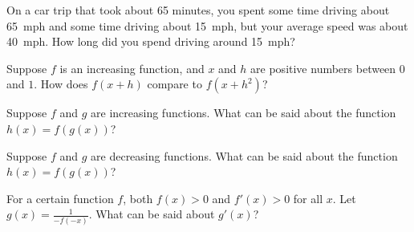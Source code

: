 \documentclass{ximera}
\newcommand{\recommendation}[1]{}
\begin{document}
\begin{problem}
  On a car trip that took about 65 minutes, you spent some time
  driving about 65~mph and some time driving about 15~mph, but your
  average speed was about 40~mph.  How long did you spend driving
  around 15~mph?
  \begin{multipleChoice}
  \end{multipleChoice}
\end{problem}

\begin{problem}
  Suppose $f$ is an increasing function, and $x$ and $h$ are positive numbers between $0$ and $1$.  How does $f(x + h)$ compare to $f(x + h^2)$?
  \begin{multipleChoice}
  \end{multipleChoice}
\end{problem}

\begin{problem}
  Suppose $f$ and $g$ are increasing functions.  What can be said about the function $h(x) = f(g(x))$?
  \begin{multipleChoice}
  \end{multipleChoice}
\end{problem}

\begin{problem}
  Suppose $f$ and $g$ are decreasing functions.  What can be said about the function $h(x) = f(g(x))$?
  \begin{multipleChoice}
  \end{multipleChoice}
\end{problem}

\begin{problem}
  For a certain function $f$, both $f(x) > 0$ and $f'(x) > 0$ for all $x$.  Let $g(x) = \frac{1}{-f(-x)}$.  What can be said about $g'(x)$?
  \begin{multipleChoice}
  \end{multipleChoice}
\end{problem}
\end{document}
